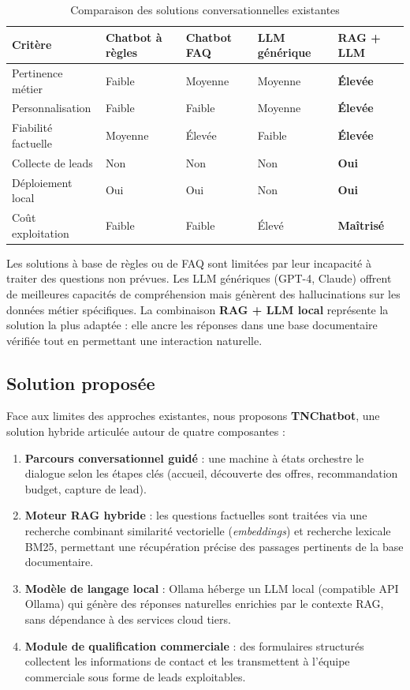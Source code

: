 \documentclass[12pt,a4paper]{report}
\begin{document}
\begin{table}[H]
\centering
\caption{Comparaison des solutions conversationnelles existantes}
\small
\begin{tabularx}{\textwidth}{|l|X|X|X|X|}
\hline
\rowcolor{tableheader}
\textbf{Critère} & \textbf{Chatbot à règles} & \textbf{Chatbot FAQ} & \textbf{LLM générique} & \textbf{RAG + LLM} \\
\hline
Pertinence métier & Faible & Moyenne & Moyenne & \textbf{Élevée} \\
\hline
Personnalisation & Faible & Faible & Moyenne & \textbf{Élevée} \\
\hline
Fiabilité factuelle & Moyenne & Élevée & Faible & \textbf{Élevée} \\
\hline
Collecte de leads & Non & Non & Non & \textbf{Oui} \\
\hline
Déploiement local & Oui & Oui & Non & \textbf{Oui} \\
\hline
Coût exploitation & Faible & Faible & Élevé & \textbf{Maîtrisé} \\
\hline
\end{tabularx}
\label{tab:existant}
\end{table}

Les solutions à base de règles ou de FAQ sont limitées par leur incapacité à traiter des
questions non prévues. Les LLM génériques (GPT-4, Claude) offrent de meilleures capacités
de compréhension mais génèrent des hallucinations sur les données métier spécifiques. La
combinaison \textbf{RAG + LLM local} représente la solution la plus adaptée : elle ancre les
réponses dans une base documentaire vérifiée tout en permettant une interaction naturelle.

\subsection{Solution proposée}

Face aux limites des approches existantes, nous proposons \textbf{TNChatbot}, une
solution hybride articulée autour de quatre composantes :

\begin{enumerate}
  \item \textbf{Parcours conversationnel guidé} : une machine à états orchestre le dialogue
  selon les étapes clés (accueil, découverte des offres, recommandation budget, capture
  de lead).
  \item \textbf{Moteur RAG hybride} : les questions factuelles sont traitées via une recherche
  combinant similarité vectorielle (\textit{embeddings}) et recherche lexicale BM25, permettant
  une récupération précise des passages pertinents de la base documentaire.
  \item \textbf{Modèle de langage local} : Ollama héberge un LLM local (compatible
  API Ollama) qui génère des réponses naturelles enrichies par le contexte RAG, sans
  dépendance à des services cloud tiers.
  \item \textbf{Module de qualification commerciale} : des formulaires structurés collectent
  les informations de contact et les transmettent à l'équipe commerciale sous forme de
  leads exploitables.
\end{enumerate}
\end{document}

